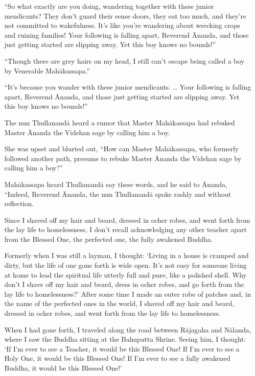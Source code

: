 \documentclass[12pt,openany]{book}%
\begin{document}
“So what exactly are you doing, wandering together with these junior mendicants? They don’t guard their sense doors, they eat too much, and they’re not committed to wakefulness. It’s like you’re wandering about wrecking crops and ruining families! Your following is falling apart, Reverend Ānanda, and those just getting started are slipping away. Yet this boy knows no bounds!” 

“Though there are grey hairs on my head, I still can’t escape being called a boy by Venerable \textsanskrit{Mahākassapa}.” 

“It’s because you wander with these junior mendicants. … Your following is falling apart, Reverend Ānanda, and those just getting started are slipping away. Yet this boy knows no bounds!” 

The nun \textsanskrit{Thullanandā} heard a rumor that Master \textsanskrit{Mahākassapa} had rebuked Master Ānanda the Videhan sage by calling him a boy. 

She was upset and blurted out, “How can Master \textsanskrit{Mahākassapa}, who formerly followed another path, presume to rebuke Master Ānanda the Videhan sage by calling him a boy?” 

\textsanskrit{Mahākassapa} heard \textsanskrit{Thullanandā} say these words, and he said to Ānanda, “Indeed, Reverend Ānanda, the nun \textsanskrit{Thullanandā} spoke rashly and without reflection. 

Since I shaved off my hair and beard, dressed in ocher robes, and went forth from the lay life to homelessness, I don’t recall acknowledging any other teacher apart from the Blessed One, the perfected one, the fully awakened Buddha. 

Formerly when I was still a layman, I thought: ‘Living in a house is cramped and dirty, but the life of one gone forth is wide open. It’s not easy for someone living at home to lead the spiritual life utterly full and pure, like a polished shell. Why don’t I shave off my hair and beard, dress in ocher robes, and go forth from the lay life to homelessness?’ After some time I made an outer robe of patches and, in the name of the perfected ones in the world, I shaved off my hair and beard, dressed in ocher robes, and went forth from the lay life to homelessness. 

When I had gone forth, I traveled along the road between \textsanskrit{Rājagaha} and \textsanskrit{Nālanda}, where I saw the Buddha sitting at the Bahuputta Shrine. Seeing him, I thought: ‘If I’m ever to see a Teacher, it would be this Blessed One! If I’m ever to see a Holy One, it would be this Blessed One! If I’m ever to see a fully awakened Buddha, it would be this Blessed One!’ 
\end{document}
